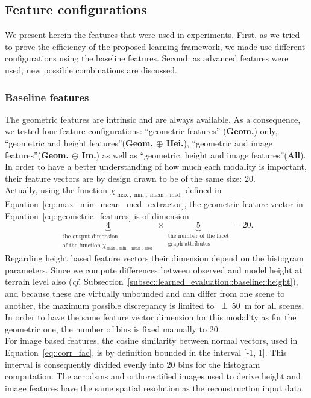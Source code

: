     \subsection{Feature configurations}
        \label{subsec::experiments::setup::feature_configurations}
        We present herein the features that were used in experiments.
        First, as we tried to prove the efficiency of the proposed learning framework, we made use different configurations using the baseline features.
        Second, as advanced features were used, new possible combinations are discussed.

        \subsubsection{Baseline features}
            The geometric features are intrinsic and are always available.
            As a consequence, we tested four feature configurations: ``geometric features'' (\textbf{Geom.}) only, ``geometric and height features''(\textbf{Geom. \(\oplus\) Hei.}), ``geometric and image features''(\textbf{Geom. \(\oplus\) Im.}) as well as ``geometric, height and image features''(\textbf{All}).
            In order to have a better understanding of how much each modality is important, their feature vectors are by design drawn to be of the same size: 20.\\
            Actually, using the function \(\chi_{\max,\min,\operatorname{mean},\operatorname{med}}\) defined in Equation~\ref{eq::max_min_mean_med_extractor}, the geometric feature vector in Equation~\ref{eq::geometric_features} is of dimension
            \begin{equation*}
                \underbrace{4}_{\substack{\text{the output dimension}\\\text{of the function } \chi_{\max,\min,\operatorname{mean},\operatorname{med}} }} \times \underbrace{5}_{\substack{\text{the number of the facet}\\\text{graph attributes}}} = 20.
            \end{equation*}
            Regarding height based feature vectors their dimension depend on the histogram parameters.
            Since we compute differences between observed and model height at terrain level also (\textit{cf.} Subsection~\ref{subsec::learned_evaluation::baseline::height}), and because these are virtually unbounded and can differ from one scene to another, the maximum possible discrepancy is limited to \SI{\pm 50}{\m} for all scenes.
            In order to have the same feature vector dimension for this modality as for the geometric one, the number of bins is fixed manually to \(20\).\\
            For image based features, the cosine similarity between normal vectors, used in Equation~\ref{eq::corr_fac}, is by definition bounded in the interval [-1, 1].
            This interval is consequently divided evenly into \(20\) bins for the histogram computation.
            The \glspl{acr::dsm} and orthorectified images used to derive height and image features have the same spatial resolution as the reconstruction input data.\\

